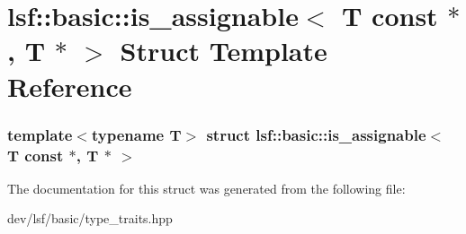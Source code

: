 \hypertarget{structlsf_1_1basic_1_1is__assignable_3_01T_01const_01_5_00_01T_01_5_01_4}{
\section{lsf::basic::is\_\-assignable$<$ T const $\ast$, T $\ast$ $>$ Struct Template Reference}
\label{structlsf_1_1basic_1_1is__assignable_3_01T_01const_01_5_00_01T_01_5_01_4}
}
\subsubsection*{template$<$typename T$>$ struct lsf::basic::is\_\-assignable$<$ T const $\ast$, T $\ast$ $>$}



The documentation for this struct was generated from the following file:\begin{DoxyCompactItemize}
\item 
dev/lsf/basic/type\_\-traits.hpp\end{DoxyCompactItemize}
